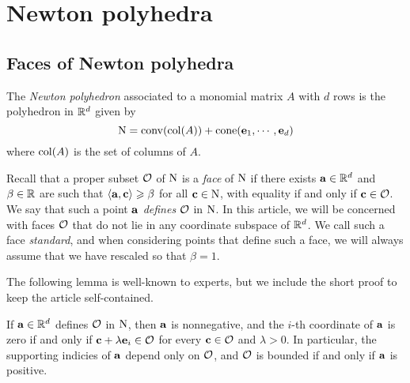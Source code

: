 \documentclass[11pt]{amsart}
\begin{document}
\newpage

\section{Newton polyhedra}
\label{newton-polyhedra: S}


\subsection{Faces of Newton polyhedra} The \emph{Newton polyhedron} associated to a monomial matrix $A$ with $d$ rows is the polyhedron in $\mathbb{R}^d$ given by 
\[ \mathrm{N} = \operatorname{conv}( \operatorname{col}(A) ) + \operatorname{cone}( \mathbf{e}_1, \cdots, \mathbf{e}_d) \] where $\operatorname{col}(A)$ is the set of columns of $A$.  

Recall that a proper  subset $\mathcal{O}$ of $\mathrm{N}$ is a \emph{face} of $\mathrm{N}$  if there exists $\mathbf{a} \in \mathbb{R}^d$ and $\beta \in \mathbb{R}$ are such that $\langle \mathbf{a}, \mathbf{c} \rangle \geqslant \beta$ for all $\mathbf{c} \in \mathrm{N}$, with equality if and only if $\mathbf{c} \in \mathcal{O}$.  We say that  such a point $\mathbf{a}$ \emph{defines} $\mathcal{O}$ in $\mathrm{N}$.    In this article, we will be concerned with faces $\mathcal{O}$ that do not lie in any coordinate subspace of $\mathbb{R}^d$.  We call such a face \emph{standard}, and when considering points that define such a face, we will always assume that we have rescaled so that $\beta = 1$. 

The following lemma is well-known to experts, but we include the short proof to keep the article self-contained.

\begin{lemma} 
\label{face: L}
If $\mathbf{a} \in \mathbb{R}^d$ defines $\mathcal{O}$ in $\mathrm{N}$, then $\mathbf{a}$ is nonnegative, and the $i$-th coordinate of $\mathbf{a}$ is zero if and only if $\mathbf{c} + \lambda \mathbf{e}_i \in \mathcal{O}$  for every $\mathbf{c} \in \mathcal{O}$ and $\lambda > 0$.  In particular, the supporting indicies of $\mathbf{a}$ depend only on $\mathcal{O}$, and $\mathcal{O}$ is bounded if and only if $\mathbf{a}$ is positive. 
\end{lemma}
\end{document}

